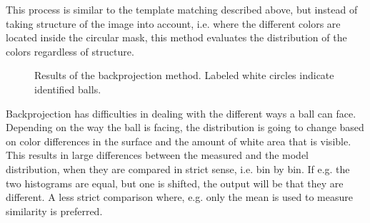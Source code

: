 This process is similar to the template matching described above, but instead of taking structure of the image into account, i.e. where the different colors are located inside the circular mask, this method evaluates the distribution of the colors regardless of structure.
\begin{figure}[htpb]
  \centering
  \quad           
   \caption{Results of the backprojection method. Labeled white circles indicate identified balls.}
  \label{fig:backprojectResults}
\end{figure}
Backprojection has difficulties in dealing with the different ways a ball can face. Depending on the way the ball is facing, the distribution is going to change based on color differences in the surface and the amount of white area that is visible. This results in large differences between the measured and the model distribution, when they are compared in strict sense, i.e. bin by bin. If e.g. the two histograms are equal, but one is shifted, the output will be that they are different. A less strict comparison where, e.g. only the mean is used to measure similarity is preferred.


